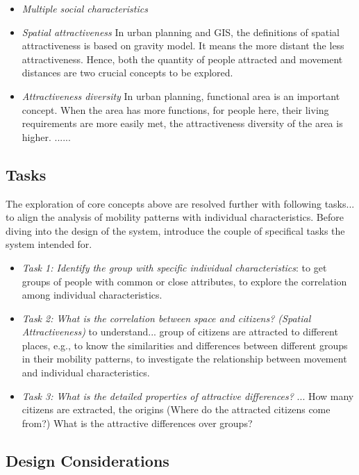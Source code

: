 \begin{itemize}
\item \textit{Multiple social characteristics} 

\item \textit{Spatial attractiveness} In urban planning and GIS, the definitions of spatial attractiveness is based on gravity model. It means the more distant the less attractiveness. Hence, both the quantity of people attracted and movement distances are two crucial concepts to be explored.

\item \textit{Attractiveness diversity} In urban planning, functional area is an important concept. When the area has more functions, for people here, their living requirements are more easily met, the attractiveness diversity of the area is higher.  ......

\end{itemize}

\subsection{Tasks}
The exploration of core concepts above are resolved further with following tasks... to align the analysis of mobility patterns with individual characteristics. Before diving into the design of the system, introduce the couple of specifical tasks the system intended for.

\begin{itemize}
\item \textit{Task 1: Identify the group with specific individual characteristics}: to get groups of people with common or close attributes, to explore the correlation among individual characteristics.
\item \textit{Task 2: What is the correlation between space and citizens? (Spatial Attractiveness)} to understand... group of citizens are attracted to different places, e.g., to know the similarities and differences between different groups in their mobility patterns, to investigate the relationship between movement and individual characteristics.
\item \textit{Task 3: What is the detailed properties of attractive differences?} ... How many citizens are extracted, the origins (Where do the attracted citizens come from?) What is the attractive differences over groups?
\end{itemize}


\subsection{Design Considerations}

